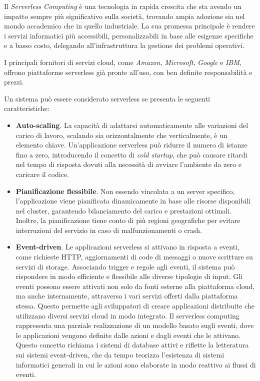 Il \textit{Serverless Computing} è una tecnologia in rapida crescita che sta avendo un impatto sempre più significativo sulla società, trovando ampia adozione sia nel mondo accademico che in quello industriale. La sua promessa principale è rendere i servizi informatici più accessibili, personalizzabili in base alle esigenze specifiche e a basso costo, delegando all'infrastruttura la gestione dei problemi operativi.

I principali fornitori di servizi cloud, come \textit{Amazon}, \textit{Microsoft}, \textit{Google} e \textit{IBM}, offrono piattaforme serverless già pronte all'uso, con ben definite responsabilità e prezzi.

Un sistema può essere considerato serverless se presenta le seguenti caratteristiche:
\begin{itemize}
    \item \textbf{Auto-scaling}. La capacità di adattarsi automaticamente alle variazioni del carico di lavoro, scalando sia orizzontalmente che verticalmente, è un elemento chiave. Un'applicazione serverless può ridurre il numero di istanze fino a zero, introducendo il concetto di \textit{cold startup}, che può causare ritardi nel tempo di risposta dovuti alla necessità di avviare l'ambiente da zero e caricare il codice.
    \item \textbf{Pianificazione flessibile}. Non essendo vincolata a un server specifico, l'applicazione viene pianificata dinamicamente in base alle risorse disponibili nel cluster, garantendo bilanciamento del carico e prestazioni ottimali. Inoltre, la pianificazione tiene conto di più regioni geografiche per evitare interruzioni del servizio in caso di malfunzionamenti o crash.
    \item \textbf{Event-driven}. Le applicazioni serverless si attivano in risposta a eventi, come richieste HTTP, aggiornamenti di code di messaggi o nuove scritture su servizi di storage. Associando trigger e regole agli eventi, il sistema può rispondere in modo efficiente e flessibile alle diverse tipologie di input. Gli eventi possono essere attivati non solo da fonti esterne alla piattaforma cloud, ma anche internamente, attraverso i vari servizi offerti dalla piattaforma stessa. Questo permette agli sviluppatori di creare applicazioni distribuite che utilizzano diversi servizi cloud in modo integrato. Il serverless computing rappresenta una parziale realizzazione di un modello basato sugli eventi, dove le applicazioni vengono definite dalle azioni e dagli eventi che le attivano. Questo concetto richiama i sistemi di database attivi e riflette la letteratura sui sistemi event-driven, che da tempo teorizza l'esistenza di sistemi informatici generali in cui le azioni sono elaborate in modo reattivo ai flussi di eventi.
    

\end{itemize}
